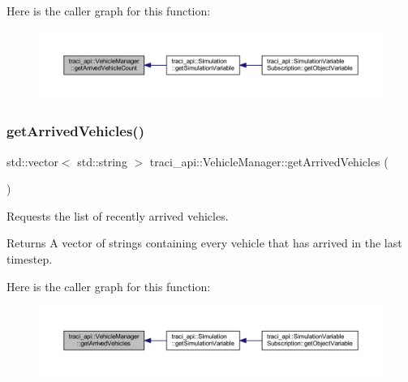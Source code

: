 Here is the caller graph for this function\+:
\nopagebreak
\begin{figure}[H]
\begin{center}
\leavevmode
\includegraphics[width=350pt]{classtraci__api_1_1_vehicle_manager_a193c8fa0b8778c496b23fc114653ebfa_icgraph}
\end{center}
\end{figure}
\mbox{\label{classtraci__api_1_1_vehicle_manager_a5ae11ca161f1e9635142a1cdd40417ca}} 
\subsubsection{\texorpdfstring{get\+Arrived\+Vehicles()}{getArrivedVehicles()}}
{\footnotesize\ttfamily std\+::vector$<$ std\+::string $>$ traci\+\_\+api\+::\+Vehicle\+Manager\+::get\+Arrived\+Vehicles (\begin{DoxyParamCaption}{ }\end{DoxyParamCaption})}



Requests the list of recently arrived vehicles. 

\begin{DoxyReturn}{Returns}
A vector of strings containing every vehicle that has arrived in the last timestep. 
\end{DoxyReturn}
Here is the caller graph for this function\+:
\nopagebreak
\begin{figure}[H]
\begin{center}
\leavevmode
\includegraphics[width=350pt]{classtraci__api_1_1_vehicle_manager_a5ae11ca161f1e9635142a1cdd40417ca_icgraph}
\end{center}
\end{figure}
\mbox{\label{classtraci__api_1_1_vehicle_manager_a707b94f1d1f82a35263ae130a0573f77}} 
